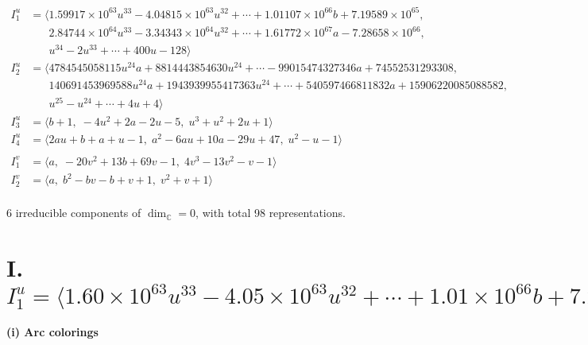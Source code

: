 \documentclass[1p]{elsarticle_modified}
\theoremstyle{definition}
\begin{document}
\begin{align*}
I^u_{1}&=\langle 
1.59917\times10^{63} u^{33}-4.04815\times10^{63} u^{32}+\cdots+1.01107\times10^{66} b+7.19589\times10^{65},\\
\phantom{I^u_{1}}&\phantom{= \langle  }2.84744\times10^{64} u^{33}-3.34343\times10^{64} u^{32}+\cdots+1.61772\times10^{67} a-7.28658\times10^{66},\\
\phantom{I^u_{1}}&\phantom{= \langle  }u^{34}-2 u^{33}+\cdots+400 u-128\rangle \\
I^u_{2}&=\langle 
4784545058115 u^{24} a+8814443854630 u^{24}+\cdots-99015474327346 a+74552531293308,\\
\phantom{I^u_{2}}&\phantom{= \langle  }140691453969588 u^{24} a+1943939955417363 u^{24}+\cdots+540597466811832 a+15906220085088582,\\
\phantom{I^u_{2}}&\phantom{= \langle  }u^{25}- u^{24}+\cdots+4 u+4\rangle \\
I^u_{3}&=\langle 
b+1,\;-4 u^2+2 a-2 u-5,\;u^3+u^2+2 u+1\rangle \\
I^u_{4}&=\langle 
2 a u+b+a+u-1,\;a^2-6 a u+10 a-29 u+47,\;u^2- u-1\rangle \\
\\
I^v_{1}&=\langle 
a,\;-20 v^2+13 b+69 v-1,\;4 v^3-13 v^2- v-1\rangle \\
I^v_{2}&=\langle 
a,\;b^2- b v- b+v+1,\;v^2+v+1\rangle \\
\end{align*}
\raggedright * 6 irreducible components of $\dim_{\mathbb{C}}=0$, with total 98 representations.\\
\newpage
\renewcommand{\arraystretch}{1}
\centering \section*{I. $I^u_{1}= \langle 1.60\times10^{63} u^{33}-4.05\times10^{63} u^{32}+\cdots+1.01\times10^{66} b+7.20\times10^{65},\;2.85\times10^{64} u^{33}-3.34\times10^{64} u^{32}+\cdots+1.62\times10^{67} a-7.29\times10^{66},\;u^{34}-2 u^{33}+\cdots+400 u-128 \rangle$}
\flushleft \textbf{(i) Arc colorings}\\
\end{document}
